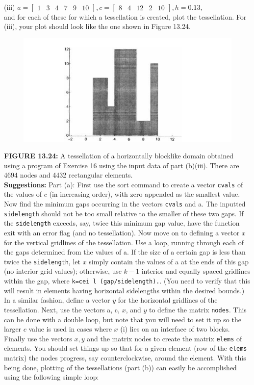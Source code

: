 \documentclass[../main.tex]{subfiles}
\begin{document}
\begin{enumerate}
\\
(iii) $a=\left[\begin{array}{llllll}1 & 3&4&7&9&10\end{array}\right], c=\left[\begin{array}{lllll}8&4 & 12&2&10\end{array}\right], h=0.13$,
\\
and for each of these for which a tessellation is created, plot the tessellation. For (iii), your plot should look like the one shown in Figure 13.24.
\begin{figure}[H]
\includegraphics[width=0.9\linewidth]{9}
	\centering
	\label{pfig:ch13_8}
\end{figure}
\textbf{FIGURE 13.24:} A tessellation of a horizontally blocklike domain obtained using a program of 
Exercise 16 using the input data of part (b)(iii). There are 4694 nodes and 4432 rectangular 
elements.
\\
\textbf{Suggestions:} Part (a): First use the sort command to create a vector \texttt{cvals}  of the values of $c$ (in increasing order), with zero appended as the smallest value. Now find the minimum gaps occurring in the vectors \texttt{cvals}  and a. The inputted \texttt{sidelength}  should not be too small relative to the smaller of these two gaps. If the \texttt{sidelength} exceeds, say, twice this minimum gap value, have the function exit with an error flag (and no tessellation). Now move on to defining a vector $x$ for the vertical gridlines of the tessellation. Use a loop, running through each of the gaps determined from the values of a. If the size of a certain gap is less than twice the \texttt{sidelength}, let $x$ simply contain the values of a at the ends of this gap (no interior grid values); otherwise, use $k-1$ interior and equally spaced gridlines within the gap, where \texttt{k=cei l (gap/sidelength).}. (You need to verify that this will result in elements having horizontal sidelengths within the desired bounds.) In a similar fashion, define a vector $y$ for the horizontal gridlines of the tessellation. Next, use the vectors a, c, $x$, and $y$ to define the matrix \texttt{nodes}. This can be done with a double loop, but note that you will need to set it up so the larger $c$ value is used in cases where $x$ (i) lies on an interface of two blocks. Finally use the vectors $x, y$ and the matrix nodes to create the matrix \texttt{elems} of elements. You should set things up so that for a given element (row of the \texttt{elems} matrix) the nodes progress, say counterclockwise, around the element. With this being done, plotting of the tessellations (part (b)) can easily be accomplished using the following simple loop:

\end{enumerate}
\end{document}
